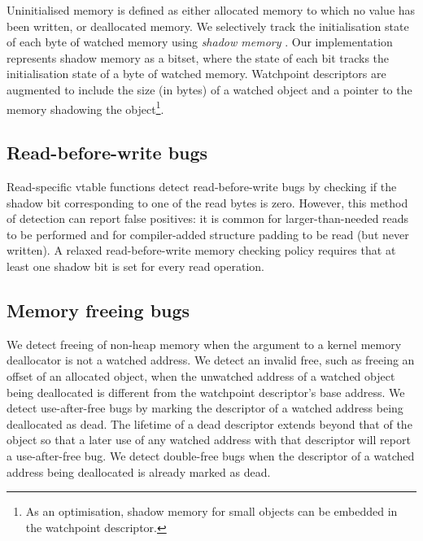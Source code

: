 Uninitialised memory is defined as either allocated memory to which no value has been written, or deallocated memory. We selectively track the initialisation state of each byte of watched memory using \emph{shadow memory} \cite{Memcheck}. Our implementation represents shadow memory as a bitset, where the state of each bit tracks the initialisation state of a byte of watched memory. Watchpoint descriptors are augmented to include the size (in bytes) of a watched object and a pointer to the memory shadowing the object\footnote{As an optimisation, shadow memory for small objects can be embedded in the watchpoint descriptor.}.



\subsection{Read-before-write bugs}
Read-specific vtable functions detect read-before-write bugs by checking if the shadow bit corresponding to one of the read bytes is zero. However, this method of detection can report false positives: it is common for larger-than-needed reads to be performed and for compiler-added structure padding to be read (but never written). A relaxed read-before-write memory checking policy requires that at least one shadow bit is set for every read operation.

\subsection{Memory freeing bugs}
We detect freeing of non-heap memory when the argument to a kernel memory deallocator is not a watched address. We detect an invalid free, such as freeing an offset of an allocated object, when the unwatched address of a watched object being deallocated is different from the watchpoint descriptor's base address. We detect use-after-free bugs by marking the descriptor of a watched address being deallocated as dead. The lifetime of a dead descriptor extends beyond that of the object so that a later use of any watched address with that descriptor will report a use-after-free bug. We detect double-free bugs when the descriptor of a watched address being deallocated is already marked as dead.



